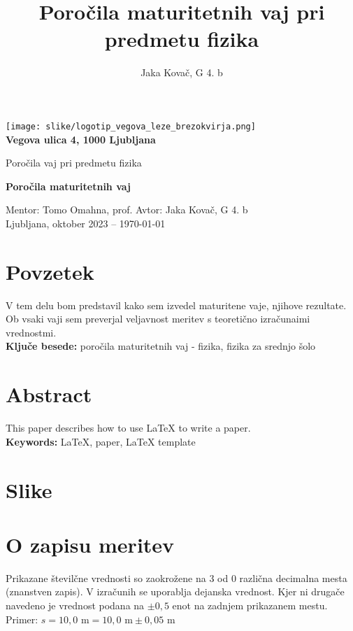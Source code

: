 \documentclass[12pt]{article}
\title{Poročila maturitetnih vaj pri predmetu fizika}
\author{Jaka Kovač, G 4. b}
\begin{document}

\begin{center}
	\thispagestyle{empty}
	\texttt{[image: slike/logotip\_vegova\_leze\_brezokvirja.png]}
	\\
	\textbf{Vegova ulica 4, 1000 Ljubljana}

	\vspace{\fill} 
	Poročila vaj pri predmetu fizika

	\Huge{\textbf{Poročila maturitetnih vaj}}

	\normalsize
	\vspace{\fill}

	Mentor: Tomo Omahna, prof. \hfill Avtor: Jaka Kovač, G 4. b\\
	\null
	Ljubljana, oktober 2023 – \MMYYYYdate\today %
\end{center}
\newpage
\thispagestyle{empty}
\null
\newpage

\section*{Povzetek}
V tem delu bom predstavil kako sem izvedel maturitene vaje, njihove rezultate. Ob vsaki vaji
sem preverjal veljavnost meritev s teoretično izračunaimi vrednostmi.
\\ %
\textbf{Ključe besede:} poročila maturitetnih vaj - fizika, fizika za srednjo šolo

\vfill
\section*{Abstract}
\foreignlanguage{english}{This paper describes how to use \LaTeX{} to write a paper.
\\ %
\textbf{Keywords:} \LaTeX{}, paper, \LaTeX{} template}
\vfill

\newpage
\thispagestyle{empty} %
\tableofcontents %

\begingroup     %
\makeatletter
\section*{Slike}
\let\clearpage\relax
\makeatother
\endgroup


\newpage

\section*{O zapisu meritev}
Prikazane številčne vrednosti so zaokrožene na 3 od 0 različna decimalna mesta (znanstven zapis).
V izračunih se uporablja dejanska vrednost. Kjer ni drugače navedeno je vrednost podana na
$\pm 0,5$ enot na zadnjem prikazanem mestu. Primer: $s = 10,0 \text{ m} = 10,0 \text{ m} \pm 0,05 \text{ m}$
\end{document}
